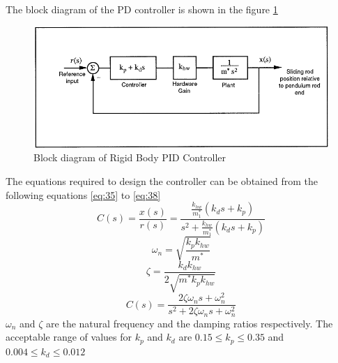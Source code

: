 \documentclass[12pt, a4paper]{article}
\begin{document}
The block diagram of the PD controller is shown in the figure \ref{Fig11}
\begin{figure}[H]
\centering
\includegraphics[width = \textwidth]{innerloop.png}
\caption{Block diagram of Rigid Body PID Controller}
\label{Fig11}
\end{figure}
The equations required to design the controller can be obtained from the following equations \eqref{eq:35} to \eqref{eq:38}
\begin{equation}\label{eq:35}
C(s) = \frac{x(s)}{r(s)} = \frac{\frac{k_{hw}}{m_1^*}(k_ds + k_p)}{s^2 + \frac{k_{hw}}{m_1^*}(k_ds + k_p)}
\end{equation}
\begin{equation}\label{eq:36}
\omega_n = \sqrt{\frac{k_pk_{hw}}{m^*}}
\end{equation}
\begin{equation}\label{eq:37}
\zeta = \frac{k_dk_{hw}}{2\sqrt{m^*k_pk_{hw}}}
\end{equation}
\begin{equation}\label{eq:38}
C(s) = \frac{2\zeta\omega_ns + \omega_n^2}{s^2 + 2\zeta\omega_ns + \omega_n^2}
\end{equation}
$\omega_n$ and $\zeta$ are the natural frequency and the damping ratios respectively. The acceptable range of values for $k_p$ and $k_d$ are $0.15 \leq k_p \leq 0.35$ and $0.004 \leq k_d \leq 0.012$
\end{document}
